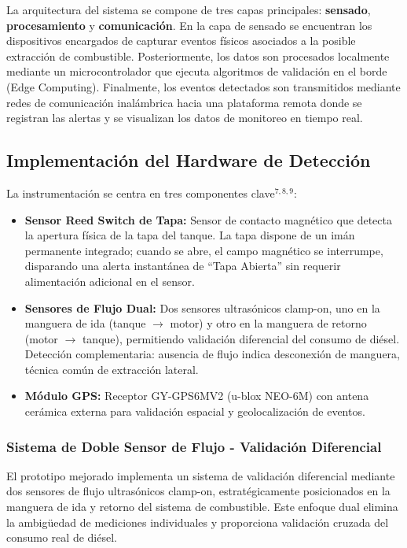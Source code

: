\documentclass[twocolumn, 10pt]{article}
\begin{document}
La arquitectura del sistema se compone de tres capas principales: \textbf{sensado}, \textbf{procesamiento} y \textbf{comunicación}. En la capa de sensado se encuentran los dispositivos encargados de capturar eventos físicos asociados a la posible extracción de combustible. Posteriormente, los datos son procesados localmente mediante un microcontrolador que ejecuta algoritmos de validación en el borde (Edge Computing). Finalmente, los eventos detectados son transmitidos mediante redes de comunicación inalámbrica hacia una plataforma remota donde se registran las alertas y se visualizan los datos de monitoreo en tiempo real.

\subsection*{Implementación del Hardware de Detección}

La instrumentación se centra en tres componentes clave$^{7,8,9}$:

\begin{itemize}
  \item \textbf{Sensor Reed Switch de Tapa:} Sensor de contacto magnético que detecta la apertura física de la tapa del tanque. La tapa dispone de un imán permanente integrado; cuando se abre, el campo magnético se interrumpe, disparando una alerta instantánea de ``Tapa Abierta'' sin requerir alimentación adicional en el sensor.
  \item \textbf{Sensores de Flujo Dual:} Dos sensores ultrasónicos clamp-on, uno en la manguera de ida (tanque $\rightarrow$ motor) y otro en la manguera de retorno (motor $\rightarrow$ tanque), permitiendo validación diferencial del consumo de diésel. Detección complementaria: ausencia de flujo indica desconexión de manguera, técnica común de extracción lateral.
  \item \textbf{Módulo GPS:} Receptor GY-GPS6MV2 (u-blox NEO-6M) con antena cerámica externa para validación espacial y geolocalización de eventos.
\end{itemize}

\subsubsection*{Sistema de Doble Sensor de Flujo - Validación Diferencial}

El prototipo mejorado implementa un sistema de validación diferencial mediante dos sensores de flujo ultrasónicos clamp-on, estratégicamente posicionados en la manguera de ida y retorno del sistema de combustible. Este enfoque dual elimina la ambigüedad de mediciones individuales y proporciona validación cruzada del consumo real de diésel.
\end{document}
